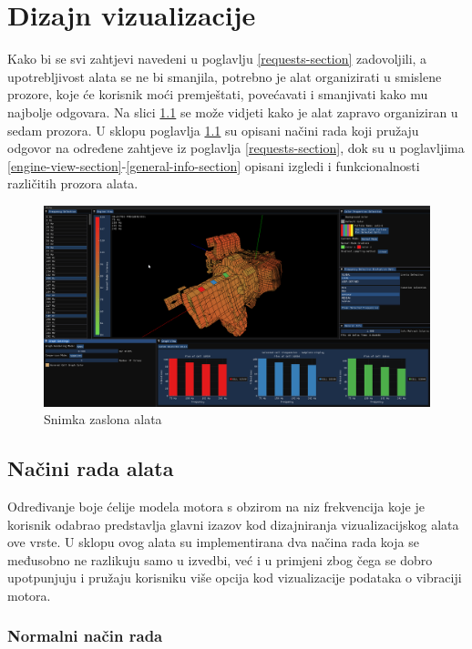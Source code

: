 \documentclass[times, utf8, diplomski]{fer}
\begin{document}
\chapter{Dizajn vizualizacije}

Kako bi se svi zahtjevi navedeni u poglavlju \ref{requests-section} zadovoljili, a upotrebljivost alata se ne bi smanjila, potrebno je alat organizirati u smislene prozore, koje će korisnik moći premještati, povećavati i smanjivati kako mu najbolje odgovara. Na slici \ref{fig:gen-screen} se može vidjeti kako je alat zapravo organiziran u sedam prozora. U sklopu poglavlja \ref{work-mode-section} su opisani načini rada koji pružaju odgovor na određene zahtjeve iz poglavlja \ref{requests-section}, dok su u poglavljima \ref{engine-view-section}-\ref{general-info-section} opisani izgledi i funkcionalnosti različitih prozora alata.

\begin{figure}[H]
\centering
\includegraphics[width=\linewidth]{general_screenshot.png}
\caption{Snimka zaslona alata}
\label{fig:gen-screen}
\end{figure}

\section{Načini rada alata} \label{work-mode-section}

Određivanje boje ćelije modela motora s obzirom na niz frekvencija koje je korisnik odabrao predstavlja glavni izazov kod dizajniranja vizualizacijskog alata ove vrste. U sklopu ovog alata su implementirana dva načina rada koja se međusobno ne razlikuju samo u izvedbi, već i u primjeni zbog čega se dobro upotpunjuju i pružaju korisniku više opcija kod vizualizacije podataka o vibraciji motora.

\subsection{Normalni način rada}
\end{document}
